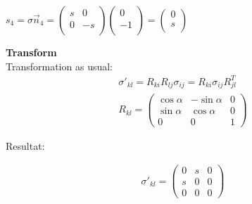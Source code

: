 \documentclass[a4paper, 10pt]{scrartcl}
\begin{document}
\begin{minipage}{14cm}
	$s_4 = \sigma \vec n_4 = \begin{pmatrix}
	s & 0\\
	0 & -s\\
	\end{pmatrix} \begin{pmatrix}
	0\\
	-1\\
	\end{pmatrix} = \begin{pmatrix}
	0\\
	s\\
	\end{pmatrix}$
	
\end{minipage}

\textbf{Transform}\\
Transformation as usual:
\begin{align}
	\sigma'_{kl}=R_{ki}R_{lj}\sigma_{ij}=R_{ki}\sigma_{ij}R_{jl}^T \\
	R_{kl}=\begin{pmatrix} 
		\cos \alpha & -\sin \alpha & 0 \\
		\sin \alpha &  \cos \alpha & 0 \\            
		0        &  0           & 1
	\end{pmatrix}
\end{align}

Resultat:

\begin{align}
	\sigma'_{kl}=\begin{pmatrix}
		0 & s & 0 \\
		s & 0 & 0 \\
		0 & 0 & 0
	\end{pmatrix}
\end{align}
\end{document}
